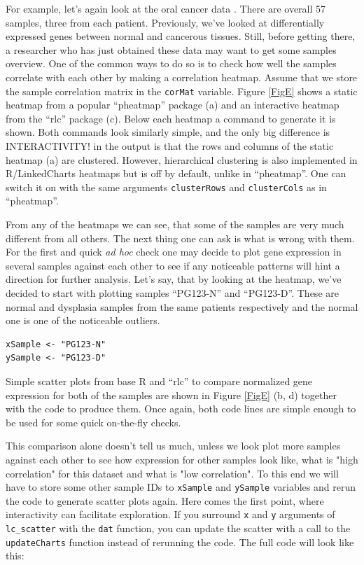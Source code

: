 \documentclass[twocolumn,10pt]{article}
\begin{document}
For example, let's again look at the oral cancer data \citep{conway_2015}. There are overall 57 samples, three from each patient. Previously, we've looked at differentially expressed genes between normal and cancerous tissues. Still, before getting there, a researcher who has just obtained these data may want to get some samples overview. One of the common ways to do so is to check how well the samples correlate with each other by making a correlation heatmap. Assume that we store the sample correlation matrix in the \texttt{corMat} variable. Figure \ref{FigE} shows a static heatmap from a popular ``pheatmap'' \citep{kolde_2019} package (a) and an interactive heatmap from  the ``rlc'' package (c). Below each heatmap a command to generate it is shown. Both commands look similarly simple, and the only big difference is INTERACTIVITY! in the output is that the rows and columns of the static heatmap (a) are clustered. However, hierarchical clustering is also implemented in R/LinkedCharts heatmaps but is off by default, unlike in ``pheatmap''. One can switch it on with the same arguments \texttt{clusterRows} and \texttt{clusterCols} as in ``pheatmap''.

From any of the heatmaps we can see, that some of the samples are very much different from all others. The next thing one can ask is what is wrong with them. For the first and quick \emph{ad hoc} check one may decide to plot gene expression in several samples against each other to see if any noticeable patterns will hint a direction for further analysis. Let's say, that by looking at the heatmap, we've decided to start with plotting samples ``PG123-N'' and ``PG123-D''. These are normal and dysplasia samples from the same patients respectively and the normal one is one of the noticeable outliers.

\begin{verbatim}
xSample <- "PG123-N"
ySample <- "PG123-D"
\end{verbatim}

Simple scatter plots from base R and ``rlc'' to compare normalized gene expression for both of the samples are shown in Figure \ref{FigE} (b, d) together with the code to produce them. Once again, both code lines are simple enough to be used for some quick on-the-fly checks.

This comparison alone doesn't tell us much, unless we look plot more samples against each other to see how expression for other samples look like, what is "high correlation" for this dataset and what is "low correlation". To this end we will have to store some other sample IDs to \texttt{xSample} and \texttt{ySample} variables and rerun the code to generate scatter plots again. Here comes the first point, where interactivity can facilitate exploration. If you surround \texttt{x} and \texttt{y} arguments of \texttt{lc_scatter} with the \texttt{dat} function, you can update the scatter with a call to the \texttt{updateCharts} function instead of rerunning the code. The full code will look like this:
\end{document}

